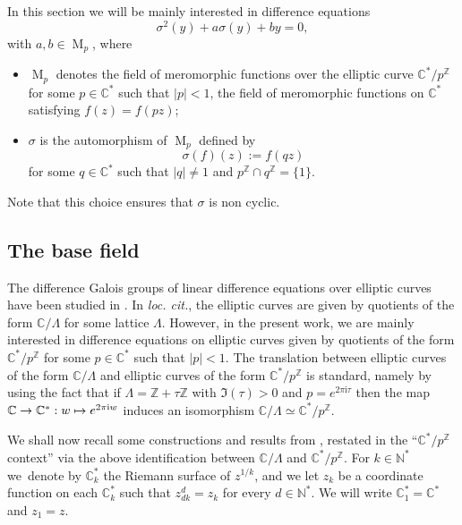 \documentclass[10pt]{amsart}
\newcommand\mto{\mathchoice{\longmapsto}{\mapsto}{\mapsto}{\mapsto}}
\theoremstyle{definition}
\newcommand{\N}{\mathbb N}
\newcommand{\Z}{\mathbb Z}
\newcommand{\C}{\mathbb C}
\let\s\sigma
\newcommand{\mero}{\operatorname{M}}
\providecommand{\loccit}{\textit{loc. cit.}}
\begin{document}
In this section we will be mainly interested in difference equations
\begin{equation}\label{eq:2hypergeo}
\s^{2}(y)+a\s (y)+by=0,
\end{equation}
with $a,b\in \mero_{p}$, where
\begin{itemize}
\item $\mero_{p}$ denotes the field of meromorphic functions over the elliptic curve $\C^{*}/p^{\Z}$ for some $p\in \C^{*}$ such that $\vert p \vert < 1$, \ie the field of meromorphic functions on $\C^{*}$ satisfying $f(z)=f(pz)$;
\item $\s$ is the automorphism of $\mero_{p}$ defined by
\[
\s (f)(z):=f(qz)
\]
for some $q\in \C^{*}$ such that $\vert q \vert \neq 1$ and $p^{\Z} \cap q^{\Z}=\{1\}$.
\end{itemize}
Note that this choice ensures that $\sigma$ is non cyclic.

\subsection{The base field}\label{sec31}

The difference Galois groups of linear difference equations over elliptic curves have been studied in \cite{dreyfus2015galois}. In \loccit, the elliptic curves are given by quotients of the form $\C/\Lambda$ for some lattice $\Lambda$.
However, in the present work, we are mainly interested in difference equations on elliptic curves given by quotients of the form $\C^{*}/p^{\Z}$ for some $p\in \C^{*}$ such that $\vert p \vert < 1$. The translation between elliptic curves of the form $\C/\Lambda$ and elliptic curves of the form $\C^{*}/p^{\Z}$ is standard, namely by using the fact that if $\Lambda=\Z+\tau \Z$ with $\Im(\tau)>0$ and $p = e^{2 \pi \mathrm{i} \tau}$ then the map $\C\to\C^{*}:w\mto e^{2\pi\mathrm{i}w}$ induces an isomorphism $\C/\Lambda\simeq \C^{*}/p^\Z$.

We shall now recall some constructions and results from \cite{dreyfus2015galois}, restated in the ``$\C^{*}/p ^{\Z}$ context'' via the above identification between $\C/\Lambda$ and $\C^{*}/p ^{\Z}$. For $k\in\N^{*}$ we~denote by $\C^{*}_k$ the Riemann surface of $z^{1/k}$, and we let $z_k$ be a coordinate function on each $\C^{*}_k$ such that $z_{dk}^d=z_k$ for every $d\in\N^{*}$. We will write $\C^{*}_1=\C^{*}$ and $z_1=z$.
\end{document}
